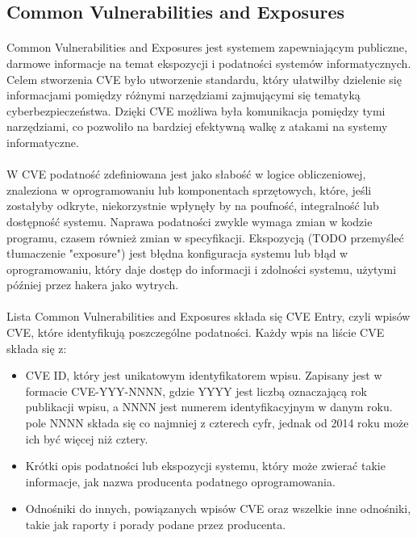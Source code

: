 \documentclass[a4paper,12pt,twoside]{article}
\begin{document}
\subsection{Common Vulnerabilities and Exposures}
\paragraph{}
Common Vulnerabilities and Exposures jest systemem zapewniającym publiczne, darmowe informacje na temat ekspozycji i podatności systemów informatycznych. Celem stworzenia CVE było utworzenie standardu, który ułatwiłby dzielenie się informacjami pomiędzy różnymi narzędziami zajmującymi się tematyką cyberbezpieczeństwa. Dzięki CVE możliwa była komunikacja pomiędzy tymi narzędziami, co pozwoliło na bardziej efektywną walkę z atakami na systemy informatyczne. 
\paragraph{}
W CVE podatność zdefiniowana jest jako słabość w logice obliczeniowej, znaleziona w oprogramowaniu lub komponentach sprzętowych, które, jeśli zostałyby odkryte, niekorzystnie wpłynęły by na poufność, integralność lub dostępność systemu. Naprawa podatności zwykle wymaga zmian w kodzie programu, czasem również zmian w specyfikacji. Ekspozycją (TODO przemyśleć tłumaczenie "exposure") jest błędna konfiguracja systemu lub błąd w oprogramowaniu, który daje dostęp do informacji i zdolności systemu, użytymi później przez hakera jako wytrych\cite{cve_mitre_terms}.   
\paragraph{}
Lista Common Vulnerabilities and Exposures składa się CVE Entry, czyli wpisów CVE, które identyfikują poszczególne podatności. Każdy wpis na liście CVE składa się z:
\begin{itemize}
\item CVE ID, który jest unikatowym identyfikatorem wpisu. Zapisany jest w formacie CVE-YYY-NNNN, gdzie YYYY jest liczbą oznaczającą rok publikacji wpisu, a NNNN jest numerem identyfikacyjnym w danym roku. pole NNNN składa się co najmniej z czterech cyfr, jednak od 2014 roku może ich być więcej niż cztery.
\item Krótki opis podatności lub ekspozycji systemu, który może zwierać takie informacje, jak nazwa producenta podatnego oprogramowania.
\item Odnośniki do innych, powiązanych wpisów CVE oraz wszelkie inne odnośniki, takie jak raporty i porady podane przez producenta.
\end{itemize}
\end{document}
